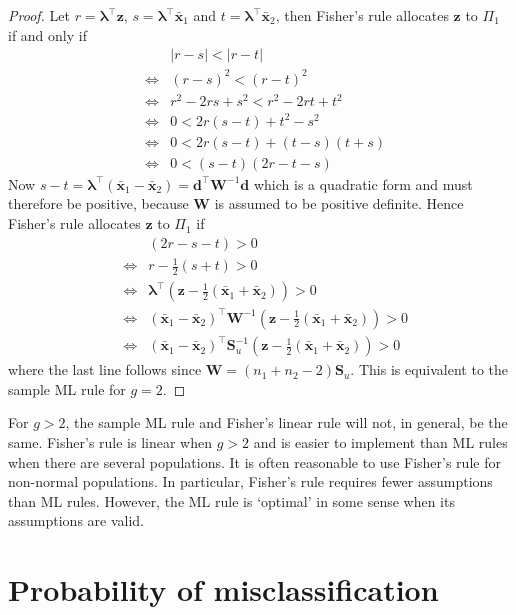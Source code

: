 \documentclass[]{book}
\theoremstyle{definition}
\theoremstyle{definition}
\theoremstyle{definition}
\theoremstyle{remark}
\begin{document}
\begin{proof}
Let \(r = \boldsymbol \lambda^\top \boldsymbol z\), \(s = \boldsymbol \lambda^\top \bar{\boldsymbol x}_1\) and \(t = \boldsymbol \lambda^\top \bar{\boldsymbol x}_2\), then Fisher's rule allocates \(\boldsymbol z\) to \(\Pi_1\) if and only if
\begin{eqnarray*}
&&| r-s | < | r-t | \\
&\iff & (r-s)^2 < (r-t)^2 \\
&\iff & r^2 - 2rs + s^2 < r^2 - 2rt + t^2 \\
&\iff & 0 < 2r(s-t) + t^2 - s^2 \\
& \iff & 0 < 2r(s-t) + (t-s)(t+s) \\
& \iff & 0 < (s-t)(2r-t-s)
\end{eqnarray*}
Now \(s-t = \boldsymbol \lambda^\top (\bar{\boldsymbol x}_1 - \bar{\boldsymbol x}_2) = \boldsymbol d^\top \boldsymbol W^{-1} \boldsymbol d\) which is a quadratic form and must therefore be positive, because \(\boldsymbol W\) is assumed to be positive definite. Hence Fisher's rule allocates \(\boldsymbol z\) to \(\Pi_1\) if
\begin{eqnarray*}
&& (2r-s-t) > 0\\
&\iff & r - \frac{1}{2}(s+t) > 0 \\
&\iff & \boldsymbol \lambda^\top \left(\boldsymbol z- \frac{1}{2}(\bar{\boldsymbol x}_1 + \bar{\boldsymbol x}_2) \right)> 0 \\
&\iff & (\bar{\boldsymbol x}_1 - \bar{\boldsymbol x}_2)^\top \boldsymbol W^{-1} \left(\boldsymbol z- \frac{1}{2}(\bar{\boldsymbol x}_1 + \bar{\boldsymbol x}_2) \right)> 0 \\
&\iff & (\bar{\boldsymbol x}_1 - \bar{\boldsymbol x}_2)^\top \boldsymbol S_u^{-1} \left(\boldsymbol z- \frac{1}{2}(\bar{\boldsymbol x}_1 + \bar{\boldsymbol x}_2) \right)> 0
\end{eqnarray*}
where the last line follows since \(\boldsymbol W= (n_1 + n_2 - 2)\boldsymbol S_u\). This is equivalent to the sample ML rule for \(g=2\).
\end{proof}

For \(g > 2\), the sample ML rule and Fisher's linear rule will not, in general, be the same. Fisher's rule is linear when \(g>2\) and is easier to implement than ML rules when there are several populations. It is often reasonable to use Fisher's rule for non-normal populations. In particular, Fisher's rule requires fewer assumptions than ML rules. However, the ML rule is `optimal' in some sense when its assumptions are valid.

\hypertarget{probability-of-misclassification}{%
\section{Probability of misclassification}\label{probability-of-misclassification}}
\end{document}
